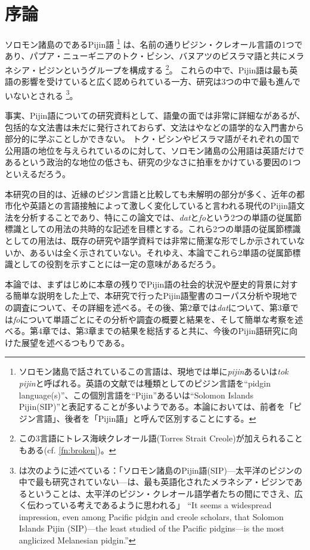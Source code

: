 \chapter{序論}
ソロモン諸島のであるPijin語
\footnote{
ソロモン諸島で話されているこの言語は、現地では単に\textit{pijin}あるいは\textit{tok pijin}と呼ばれる。英語の文献では種類としてのピジン言語を``pidgin language(s)''、この個別言語を``Pijin''あるいは``Solomon Islands Pijin(SIP)''と表記することが多いようである。本論においては、前者を「ピジン言語」、後者を「Pijin語」と呼んで区別することにする。}
は、名前の通りピジン・クレオール言語の1つであり、パプア・ニューギニアのトク・ピシン、バヌアツのビスラマ語と共にメラネシア・ピジンというグループを構成する
\footnote{
この3言語にトレス海峡クレオール語(Torres Strait Creole)が加えられることもある(cf. \ref{fn:broken})。
}。
これらの中で、Pijin語は最も英語の影響を受けていると広く認められている一方、研究は3つの中で最も進んでいないとされる
\footnote{
\citet{nativization}は次のように述べている：「ソロモン諸島のPijin語(SIP)---太平洋のピジンの中で最も研究されていない---は、最も英語化されたメラネシア・ピジンであるということは、太平洋のピジン・クレオール語学者たちの間にでさえ、広く伝わっている考えであるように思われる」
  ``It seems a widespread impression, even among Pacific pidgin and creole scholars, that Solomon Islands Pijin (SIP)---the least studied of the Pacific pidgins---is the most anglicized Melanesian pidgin.''
}。

事実、Pijin語についての研究資料として、語彙の面では非常に詳細な\cite{dictionary}があるが、包括的な文法書は未だに発行されておらず\citep{phonology}、文法は\cite{yumi}や\cite{eric}などの語学的な入門書から部分的に学ぶことしかできない。
トク・ピシンやビスラマ語がそれぞれの国で公用語の地位を与えられているのに対して、ソロモン諸島の公用語は英語だけであるという政治的な地位の低さも、研究の少なさに拍車をかけている要因の1つといえるだろう。

本研究の目的は、近縁のピジン言語と比較しても未解明の部分が多く、近年の都市化や英語との言語接触によって激しく変化していると言われる現代のPijin語文法を分析することであり、特にこの論文では、\textit{dat}と\textit{fo}という2つの単語の従属節標識としての用法の共時的な記述を目標とする。これら2つの単語の従属節標識としての用法は、既存の研究や語学資料では非常に簡潔な形でしか示されていないか、あるいは全く示されていない。それゆえ、本論でこれら2単語の従属節標識としての役割を示すことには一定の意味があるだろう。

本論では、まずはじめに本章の残りでPijin語の社会的状況や歴史的背景に対する簡単な説明をした上で、本研究で行ったPijin語聖書のコーパス分析や現地での調査について、その詳細を述べる。その後、第2章では\textit{dat}について、第3章では\textit{fo}について単語ごとにその分析や調査の概要と結果を、そして簡単な考察を述べる。第4章では、第3章までの結果を総括すると共に、今後のPijin語研究に向けた展望を述べるつもりである。

